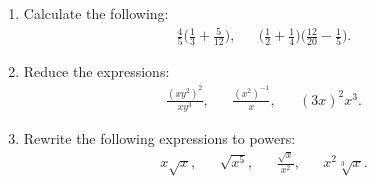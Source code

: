 \begin{enumerate}
\item Calculate the following:
\begin{align*}
\frac{4}{5}\Big(\frac{1}{3}+\frac{5}{12}\Big),&&\Big(\frac{1}{2}+\frac{1}{4}\Big)\Big(\frac{12}{20}-\frac{1}{5}\Big).
\end{align*}

\item Reduce the expressions:
\begin{align*}
\frac{(xy^2)^2}{xy^3},&& \frac{(x^2)^{-1}}{x},&& (3x)^2x^3.
\end{align*}




\item Rewrite the following expressions to powers:
\begin{align*}
x\sqrt{x},&& \sqrt{x^5},&& \frac{\sqrt{x}}{x^2},&& x^2\sqrt[3]{x}.
\end{align*}



















\end{enumerate}

